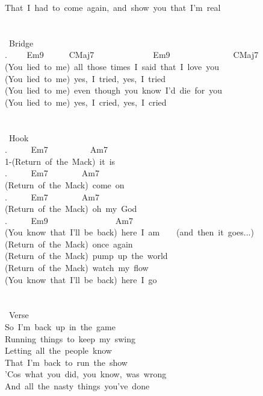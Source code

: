 {That\ I\ had\ to\ come\ again,\ and\ show\ you\ that\ I'm\ real\\
\\
\\
\lbrack\ Bridge\rbrack\\
. \ \ \ \ Em9\ \ \ \ \ \ CMaj7\ \ \ \ \ \ \ \ \ \ \ \ \ \ Em9\ \ \ \ \ \ \ \ \ \ \ \ \ \ \ CMaj7\\
(You\ lied\ to\ me)\ all\ those\ times\ I\ said\ that\ I\ love\ you\\
(You\ lied\ to\ me)\ yes,\ I\ tried,\ yes,\ I\ tried\\
(You\ lied\ to\ me)\ even\ though\ you\ know\ I'd\ die\ for\ you\\
(You\ lied\ to\ me)\ yes,\ I\ cried,\ yes,\ I\ cried\\
\\
\\
\lbrack\ Hook\rbrack\\
. \ \ \ \ \ Em7\ \ \ \ \ \ \ \ \ \ Am7\\
1-(Return\ of\ the\ Mack)\ it\ is\\
. \ \ \ \ \ Em7\ \ \ \ \ \ \ \ Am7\ \\
(Return\ of\ the\ Mack)\ come\ on\\
. \ \ \ \ \ Em7\ \ \ \ \ \ \ \ Am7\\
(Return\ of\ the\ Mack)\ oh\ my\ God\\
. \ \ \ \ \ Em9\ \ \ \ \ \ \ \ \ \ \ \ \ \ \ \ Am7\\
(You\ know\ that\ I'll\ be\ back)\ here\ I\ am\ \ \ \ (and\ then\ it\ goes...)\\
(Return\ of\ the\ Mack)\ once\ again\\
(Return\ of\ the\ Mack)\ pump\ up\ the\ world\\
(Return\ of\ the\ Mack)\ watch\ my\ flow\\
(You\ know\ that\ I'll\ be\ back)\ here\ I\ go\\
\\
\\
\lbrack\ Verse\rbrack\\
So\ I'm\ back\ up\ in\ the\ game\\
Running\ things\ to\ keep\ my\ swing\\
Letting\ all\ the\ people\ know\\
That\ I'm\ back\ to\ run\ the\ show\\
'Cos\ what\ you\ did,\ you\ know,\ was\ wrong\\
And\ all\ the\ nasty\ things\ you've\ done\\
}
